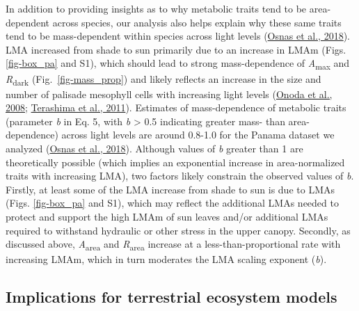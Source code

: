 \documentclass[
  12pt,
  letterpaper,
  DIV=11,
  numbers=noendperiod]{scrartcl}
\begin{document}
In addition to providing insights as to why metabolic traits tend to be
area-dependent across species, our analysis also helps explain why these
same traits tend to be mass-dependent within species across light levels
(\protect\hyperlink{ref-Osnas2018}{Osnas et al., 2018}). LMA increased
from shade to sun primarily due to an increase in LMAm (Figs.
\ref{fig-box_pa} and S1), which should lead to strong mass-dependence of
\emph{A}\textsubscript{max} and \emph{R}\textsubscript{dark}
(Fig.~\ref{fig-mass_prop}) and likely reflects an increase in the size
and number of palisade mesophyll cells with increasing light levels
(\protect\hyperlink{ref-Onoda2008}{Onoda et al., 2008};
\protect\hyperlink{ref-Terashima2011}{Terashima et al., 2011}).
Estimates of mass-dependence of metabolic traits (parameter \emph{b} in
Eq. 5, with \emph{b} \textgreater{} 0.5 indicating greater mass- than
area-dependence) across light levels are around 0.8-1.0 for the Panama
dataset we analyzed (\protect\hyperlink{ref-Osnas2018}{Osnas et al.,
2018}). Although values of \emph{b} greater than 1 are theoretically
possible (which implies an exponential increase in area-normalized
traits with increasing LMA), two factors likely constrain the observed
values of \emph{b}. Firstly, at least some of the LMA increase from
shade to sun is due to LMAs (Figs. \ref{fig-box_pa} and S1), which may
reflect the additional LMAs needed to protect and support the high LMAm
of sun leaves and/or additional LMAs required to withstand hydraulic or
other stress in the upper canopy. Secondly, as discussed above,
\emph{A}\textsubscript{area} and \emph{R}\textsubscript{area} increase
at a less-than-proportional rate with increasing LMAm, which in turn
moderates the LMA scaling exponent (\emph{b}).

\hypertarget{implications-for-terrestrial-ecosystem-models}{%
\subsection{Implications for terrestrial ecosystem
models}\label{implications-for-terrestrial-ecosystem-models}}
\end{document}
